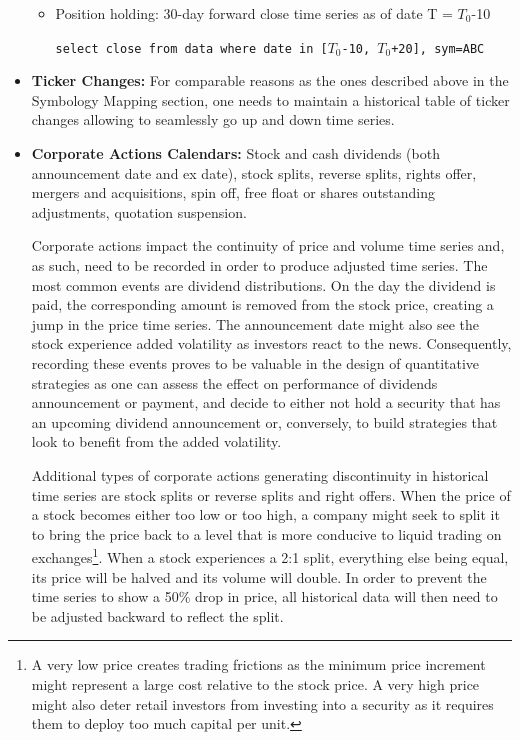 \begin{itemize}
\begin{itemize}
\item Position holding: 30-day forward close time series as of date T = $T_0$-10

{\tt select close from data where date in [$T_0$-10,  $T_0$+20], sym=ABC}
\end{itemize}

\item \textbf{Ticker Changes:} For comparable reasons as the ones described above in the Symbology Mapping section, one needs to maintain a historical table of ticker changes allowing to seamlessly go up and down time series. 

\item \textbf{Corporate Actions Calendars:} Stock and cash dividends (both announcement date and ex date), stock splits, reverse splits, rights offer, mergers and acquisitions, spin off, free float or shares outstanding adjustments, quotation suspension.


Corporate actions impact the continuity of price and volume time series and, as such, need to be recorded in order to produce adjusted time series. The most common events are dividend distributions. On the day the dividend is paid, the corresponding amount is removed from the stock price, creating a jump in the price time series. The announcement date might also see the stock experience added volatility as investors react to the news. Consequently, recording these events proves to be valuable in the design of quantitative strategies as one can assess the effect on performance of dividends announcement or payment, and decide to either not hold a security that has an upcoming dividend announcement or, conversely, to build strategies that look to benefit from the added volatility. 


Additional types of corporate actions generating discontinuity in historical time series are stock splits or reverse splits and right offers. When the price of a stock becomes either too low or too high, a company might seek to split it to bring the price back to a level that is more conducive to liquid trading on exchanges\footnote{A very low price creates trading frictions as the minimum price increment might represent a large cost relative to the stock price. A very high price might also deter retail investors from investing into a security as it requires them to deploy too much capital per unit.}. When a stock experiences a 2:1 split, everything else being equal, its price will be halved and its volume will double. In order to prevent the time series to show a 50\% drop in price, all historical data will then need to be adjusted backward to reflect the split.



\end{itemize}
